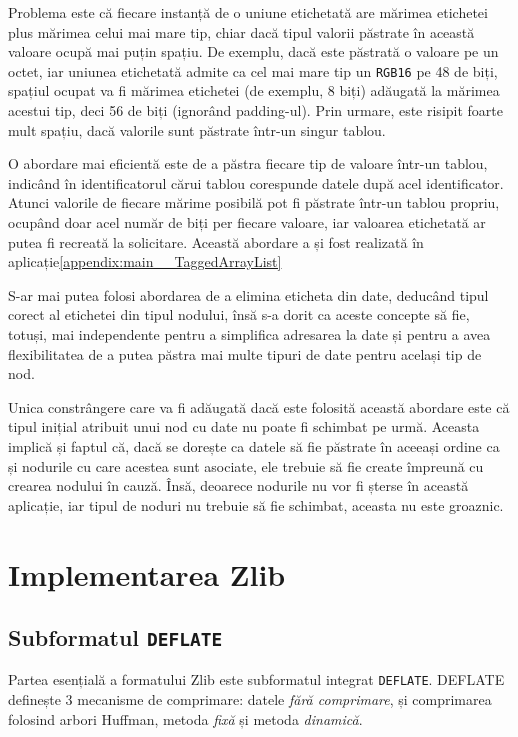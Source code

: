 \documentclass[a4paper,12pt]{report}
\begin{document}
Problema este că fiecare instanță de o uniune etichetată are
mărimea etichetei plus mărimea celui mai mare tip,
chiar dacă tipul valorii păstrate în această valoare ocupă mai puțin spațiu.
De exemplu, dacă este păstrată o valoare pe un octet,
iar uniunea etichetată admite ca cel mai mare tip un \texttt{RGB16} pe 48 de biți,
spațiul ocupat va fi mărimea etichetei (de exemplu, 8 biți) adăugată la mărimea acestui tip,
deci 56 de biți (ignorând padding-ul).
Prin urmare, este risipit foarte mult spațiu, dacă valorile sunt păstrate într-un singur tablou.

O abordare mai eficientă este de a păstra fiecare tip de valoare într-un tablou,
indicând în identificatorul cărui tablou corespunde datele după acel identificator.
Atunci valorile de fiecare mărime posibilă pot fi păstrate într-un tablou propriu,
ocupând doar acel număr de biți per fiecare valoare, 
iar valoarea etichetată ar putea fi recreată la solicitare.
Această abordare a și fost realizată în aplicație\ref{appendix:main__TaggedArrayList}

S-ar mai putea folosi abordarea de a elimina eticheta din date,
deducând tipul corect al etichetei din tipul nodului,
însă s-a dorit ca aceste concepte să fie, totuși, mai independente pentru
a simplifica adresarea la date și pentru a avea flexibilitatea de
a putea păstra mai multe tipuri de date pentru același tip de nod.

Unica constrângere care va fi adăugată dacă este folosită această abordare este că
tipul inițial atribuit unui nod cu date nu poate fi schimbat pe urmă.
Aceasta implică și faptul că, dacă se dorește ca datele să fie păstrate în aceeași ordine ca și
nodurile cu care acestea sunt asociate, ele trebuie să fie create împreună cu crearea nodului în cauză.
Însă, deoarece nodurile nu vor fi șterse în această aplicație,
iar tipul de noduri nu trebuie să fie schimbat, aceasta nu este groaznic.


\section{Implementarea Zlib}

\subsection{Subformatul \texttt{DEFLATE}}

Partea esențială a formatului Zlib este subformatul integrat \texttt{DEFLATE}\cite{deflate_spec}.
DEFLATE definește 3 mecanisme de comprimare: datele \textit{fără comprimare},
și comprimarea folosind arbori Huffman, metoda \textit{fixă} și metoda \textit{dinamică}.
\end{document}
